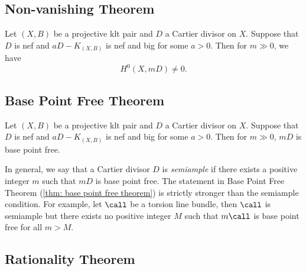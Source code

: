 \subsection{Non-vanishing Theorem}

    \begin{theorem}\label{thm: non-vanishing theorem}
        Let \((X,B)\) be a projective klt pair and \(D\) a Cartier divisor on \(X\).
        Suppose that \(D\) is nef and \(aD-K_{(X,B)}\) is nef and big for some \(a > 0\).
        Then for \(m \gg 0\), we have 
        \[ H^0(X,mD) \neq 0. \]
    \end{theorem}

\subsection{Base Point Free Theorem}

    \begin{theorem}\label{thm: base point free theorem}
        Let \((X,B)\) be a projective klt pair and \(D\) a Cartier divisor on \(X\).
        Suppose that \(D\) is nef and \(aD-K_{(X,B)}\) is nef and big for some \(a > 0\).
        Then for \(m \gg 0\), \(mD\) is base point free.
    \end{theorem}

    \begin{remark}\label{rmk:statement_in_BPF_theorem_stronger_than_semiample}
        In general, we say that a Cartier divisor \(D\) is \emph{semiample} if there exists a positive integer \(m\) such that \(mD\) is base point free.
        The statement in Base Point Free Theorem (\cref{thm: base point free theorem}) is strictly stronger than the semiample condition.
        For example, let \(\call\) be a torsion line bundle, then \(\call\) is semiample but there exists no positive integer \(M\) such that \(m\call\) is base point free for all \(m>M\).
    \end{remark}

\subsection{Rationality Theorem}

    


